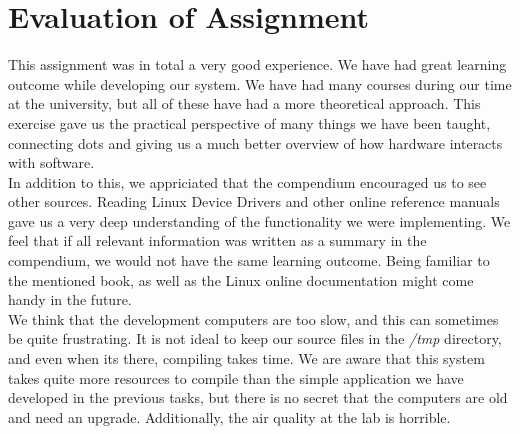 \section{Evaluation of Assignment}
This assignment was in total a very good experience. We have had great learning outcome while developing our system. We have had many courses during our time at the university, but all of these have had a more theoretical approach. This exercise gave us the practical perspective of many things we have been taught, connecting dots and giving us a much better overview of how hardware interacts with software. \\

In addition to this, we appriciated that the compendium encouraged us to see other sources. Reading Linux Device Drivers and other online reference manuals gave us a very deep understanding of the functionality we were implementing. We feel that if all relevant information was written as a summary in the compendium, we would not have the same learning outcome. Being familiar to the mentioned book, as well as the Linux online documentation might come handy in the future. \\

We think that the development computers are too slow, and this can sometimes be quite frustrating. It is not ideal to keep our source files in the \emph{/tmp} directory, and even when its there, compiling takes time. We are aware that this system takes quite more resources to compile than the simple application we have developed in the previous tasks, but there is no secret that the computers are old and need an upgrade. Additionally, the air quality at the lab is horrible.
